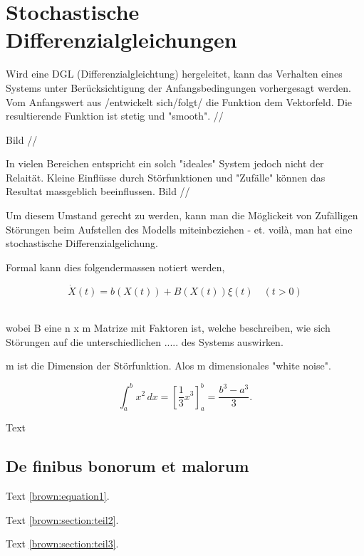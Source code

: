 %
%
%
%
\section{Stochastische Differenzialgleichungen\label{brown:section:teil1}}

Wird eine DGL (Differenzialgleichtung) hergeleitet, kann das Verhalten eines Systems unter Berücksichtigung der Anfangsbedingungen vorhergesagt werden. Vom Anfangswert aus /entwickelt sich/folgt/ die Funktion dem Vektorfeld. Die resultierende Funktion ist stetig und "smooth". 
//


Bild
//


In vielen Bereichen entspricht  ein solch "ideales" System jedoch nicht der Relaität. Kleine Einflüsse durch Störfunktionen und "Zufälle" können das Resultat massgeblich beeinflussen. 
Bild
//


Um diesem Umstand gerecht zu werden, kann man die Möglickeit von Zufälligen Störungen beim Aufstellen des Modells miteinbeziehen - et. voilà, man hat eine stochastische Differenzialgelichung.

Formal kann dies folgendermassen notiert werden, 

\begin{equation}
\dot{X}(t) = b(X(t)) + B(X(t))\xi(t) \quad (t>0)
\end{equation}\

wobei B eine n x m Matrize mit Faktoren ist, welche beschreiben, wie sich Störungen auf die unterschiedlichen ..... des Systems auswirken.

m ist die Dimension der Störfunktion. Alos m dimensionales "white noise".






\begin{equation}
	\int_a^b x^2\, dx
	=
	\left[ \frac13 x^3 \right]_a^b
	=
	\frac{b^3-a^3}3.
	\label{brown:equation1}
\end{equation}

Text

\subsection{De finibus bonorum et malorum
\label{brown:subsection:finibus}}

Text \eqref{brown:equation1}.

Text
\ref{brown:section:teil2}.

Text
\ref{brown:section:teil3}.



